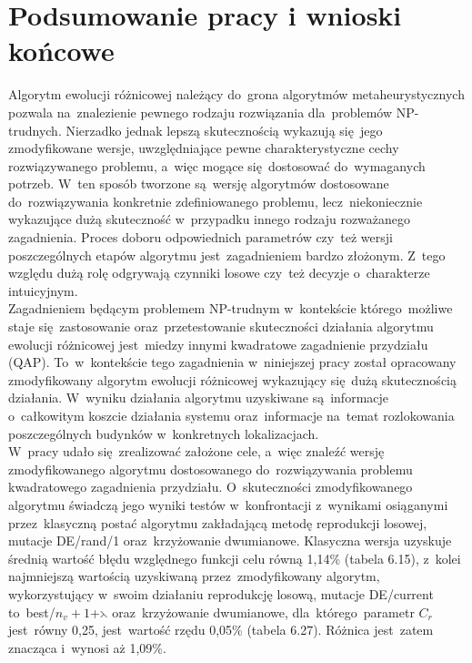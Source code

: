 \chapter{Podsumowanie pracy i wnioski końcowe}\label{cha:pierwszyDokument}
Algorytm ewolucji różnicowej należący do~grona algorytmów metaheurystycznych pozwala na~znalezienie pewnego rodzaju rozwiązania dla~problemów NP-trudnych. Nierzadko jednak lepszą skutecznością wykazują się~jego zmodyfikowane wersje, uwzględniające pewne charakterystyczne cechy rozwiązywanego problemu, a~więc mogące się~dostosować do~wymaganych potrzeb. W~ten sposób tworzone są~wersję algorytmów dostosowane do~rozwiązywania konkretnie zdefiniowanego problemu, lecz~niekoniecznie wykazujące dużą skuteczność w~przypadku innego rodzaju rozważanego zagadnienia. Proces doboru odpowiednich parametrów czy~też wersji poszczególnych etapów algorytmu jest~zagadnieniem bardzo złożonym. Z~tego względu dużą rolę odgrywają czynniki losowe czy~też decyzje o~charakterze intuicyjnym.\\

Zagadnieniem będącym problemem NP-trudnym w~kontekście którego~możliwe staje się~zastosowanie oraz~przetestowanie skuteczności działania algorytmu ewolucji różnicowej jest~miedzy innymi kwadratowe zagadnienie przydziału (QAP). To~w~kontekście tego zagadnienia w~niniejszej pracy został opracowany zmodyfikowany algorytm ewolucji różnicowej wykazujący się~dużą skutecznością działania. W~wyniku działania algorytmu uzyskiwane są~informacje o~całkowitym koszcie działania systemu oraz~informacje na~temat rozlokowania poszczególnych budynków w~konkretnych lokalizacjach.\\

W~pracy udało się~zrealizować założone cele, a~więc znaleźć wersję zmodyfikowanego algorytmu dostosowanego do~rozwiązywania problemu kwadratowego zagadnienia przydziału. O~skuteczności zmodyfikowanego algorytmu świadczą jego wyniki testów w~konfrontacji z~wynikami osiąganymi przez~klasyczną postać algorytmu zakładającą metodę reprodukcji losowej, mutacje DE/rand/1 oraz~krzyżowanie dwumianowe. Klasyczna wersja uzyskuje średnią wartość błędu względnego funkcji celu równą 1,14\% (tabela 6.15), z~kolei najmniejszą wartością uzyskiwaną przez~zmodyfikowany algorytm, wykorzystujący w~swoim działaniu reprodukcję losową, mutacje DE/current to~best/$n_{v}+1$+$\leftthreetimes$ oraz~krzyżowanie dwumianowe, dla~którego~parametr $C_{r}$ jest~równy 0,25, jest~wartość rzędu 0,05\% (tabela 6.27). Różnica jest~zatem znacząca i~wynosi aż 1,09\%.\\

